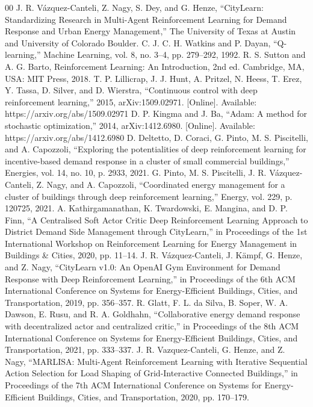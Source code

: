 \documentclass[conference]{IEEEtran}
\begin{document}
\begin{thebibliography}{00}
 J. R. Vázquez-Canteli, Z. Nagy, S. Dey, and G. Henze, 
``CityLearn: Standardizing Research in Multi-Agent Reinforcement Learning for Demand Response and Urban Energy Management,'' 
The University of Texas at Austin and University of Colorado Boulder.
 C. J. C. H. Watkins and P. Dayan, ``Q-learning,'' Machine Learning, vol. 8, no. 3--4, pp. 279--292, 1992.
 R. S. Sutton and A. G. Barto, Reinforcement Learning: An Introduction, 2nd ed. Cambridge, MA, USA: MIT Press, 2018.
 T. P. Lillicrap, J. J. Hunt, A. Pritzel, N. Heess, T. Erez, Y. Tassa, D. Silver, and D. Wierstra, ``Continuous control with deep reinforcement learning,'' 2015, arXiv:1509.02971. [Online]. Available: https://arxiv.org/abs/1509.02971
 D. P. Kingma and J. Ba, ``Adam: A method for stochastic optimization,'' 2014, arXiv:1412.6980. [Online]. Available: https://arxiv.org/abs/1412.6980
 D. Deltetto, D. Coraci, G. Pinto, M. S. Piscitelli, and A. Capozzoli, ``Exploring the potentialities of deep reinforcement learning for incentive-based demand response in a cluster of small commercial buildings,'' Energies, vol. 14, no. 10, p. 2933, 2021.
 G. Pinto, M. S. Piscitelli, J. R. V\'{a}zquez-Canteli, Z. Nagy, and A. Capozzoli, ``Coordinated energy management for a cluster of buildings through deep reinforcement learning,'' Energy, vol. 229, p. 120725, 2021.
 A. Kathirgamanathan, K. Twardowski, E. Mangina, and D. P. Finn, ``A Centralised Soft Actor Critic Deep Reinforcement Learning Approach to District Demand Side Management through CityLearn,'' in Proceedings of the 1st International Workshop on Reinforcement Learning for Energy Management in Buildings \& Cities, 2020, pp. 11--14.
 J. R. V\'{a}zquez-Canteli, J. K\"{a}mpf, G. Henze, and Z. Nagy, ``CityLearn v1.0: An OpenAI Gym Environment for Demand Response with Deep Reinforcement Learning,'' in Proceedings of the 6th ACM International Conference on Systems for Energy-Efficient Buildings, Cities, and Transportation, 2019, pp. 356--357.
 R. Glatt, F. L. da Silva, B. Soper, W. A. Dawson, E. Rusu, and R. A. Goldhahn, ``Collaborative energy demand response with decentralized actor and centralized critic,'' in Proceedings of the 8th ACM International Conference on Systems for Energy-Efficient Buildings, Cities, and Transportation, 2021, pp. 333--337.
 J. R. Vazquez-Canteli, G. Henze, and Z. Nagy, ``MARLISA: Multi-Agent Reinforcement Learning with Iterative Sequential Action Selection for Load Shaping of Grid-Interactive Connected Buildings,'' in Proceedings of the 7th ACM International Conference on Systems for Energy-Efficient Buildings, Cities, and Transportation, 2020, pp. 170--179.
\end{thebibliography}
\end{document}
